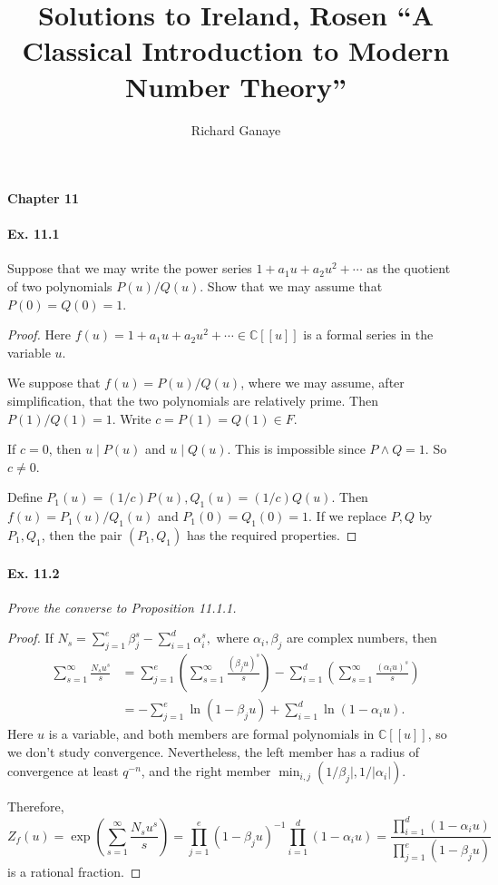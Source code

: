 \documentclass[11pt,a4paper]{article}
\title{Solutions to Ireland, Rosen ``A Classical Introduction to Modern Number Theory''}
\author{Richard Ganaye}
\newcommand{\C}{\mathbb{C}}
\begin{document}
{ \Large \bf Chapter 11} 

\paragraph{Ex. 11.1} Suppose that we may write the power series $1+a_1u +a_2u^2+\cdots$ as the quotient of two polynomials $P(u)/Q(u)$. Show that we may assume that $P(0) = Q(0) = 1$.
{\it 

}
\begin{proof}
Here $f(u) = 1+a_1u +a_2u^2+\cdots \in \C[[u]]$ is a formal series in the variable $u$.

We suppose that $f(u) = P(u)/Q(u)$, where we may assume, after simplification, that the two polynomials are relatively prime. Then $P(1)/Q(1) =1$. Write $c = P(1) = Q(1) \in F$.

If $c = 0$, then $u\mid P(u)$ and $u \mid Q(u)$. This is impossible since $P \wedge Q = 1$. So $c \ne 0$.

Define $P_1(u) = (1/c) P(u), Q_1(u) = (1/c) Q(u)$. Then $f(u) = P_1(u)/Q_1(u)$ and $P_1(0) = Q_1(0) = 1$. If we replace $P,Q$ by $P_1,Q_1$, then the pair $(P_1,Q_1)$ has the required properties.
\end{proof}

\paragraph{Ex. 11.2}{\it Prove the converse to Proposition 11.1.1.
}

\begin{proof}
If $N_s = \sum_{j=1}^e \beta_j^s - \sum_{i=1}^d \alpha_i^s,$ where $\alpha_i,\beta_j$ are complex numbers,  then
\begin{align*}
\sum_{s=1}^\infty \frac{N_s u^s}{s} &=  \sum_{j=1}^e \left( \sum_{s=1}^\infty \frac{(\beta_j u)^s}{s} \right) - \sum_{i=1}^d \left( \sum_{s=1}^\infty \frac{(\alpha_i u)^s}{s} \right)\\
&=-\sum_{j=1}^e \ln(1 - \beta_ju) + \sum_{i=1}^d \ln(1 - \alpha_i u).
\end{align*}
Here $u$ is a variable, and both members are formal polynomials in $\C[[u]]$, so we don't study convergence. Nevertheless, the left member has a radius of convergence at least $q^{-n}$, and the right member $\min_{i,j}(1/\beta_j|,1/|\alpha_i|)$.

Therefore,
$$Z_f(u) = \exp\left(\sum_{s=1}^\infty \frac{N_s u^s}{s} \right) = \prod_{j=1}^e(1 - \beta_j u)^{-1} \prod_{i=1}^d (1-\alpha_i u) = \frac{\prod_{i=1}^d (1 - \alpha_i u)}{\prod_{j=1}^e (1 - \beta_j u)}$$
is a rational fraction.
\end{proof}
\end{document}
